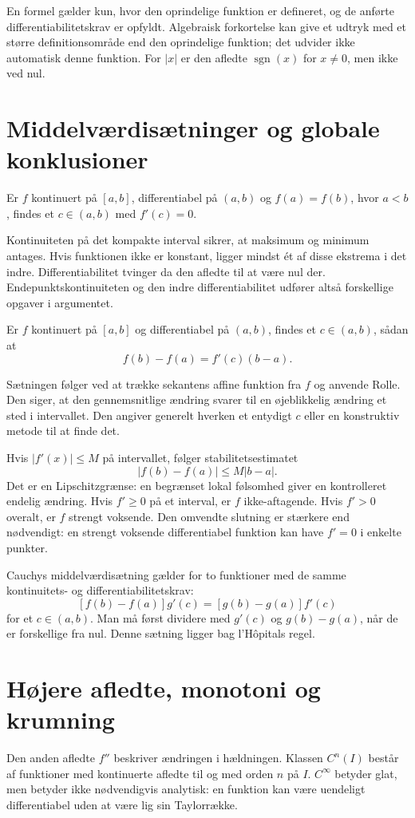 En formel gælder kun, hvor den oprindelige funktion er defineret, og de anførte differentiabilitetskrav er opfyldt. Algebraisk forkortelse kan give et udtryk med et større definitionsområde end den oprindelige funktion; det udvider ikke automatisk denne funktion. For $|x|$ er den afledte $\operatorname{sgn}(x)$ for $x\ne0$, men ikke ved nul.

\section{Middelværdisætninger og globale konklusioner}
\label{sec:middel}
\begin{saetning}[Rolle]
Er $f$ kontinuert på $[a,b]$, differentiabel på $(a,b)$ og $f(a)=f(b)$, hvor $a<b$, findes et $c\in(a,b)$ med $f'(c)=0$.
\end{saetning}
Kontinuiteten på det kompakte interval sikrer, at maksimum og minimum antages. Hvis funktionen ikke er konstant, ligger mindst ét af disse ekstrema i det indre. Differentiabilitet tvinger da den afledte til at være nul der. Endepunktskontinuiteten og den indre differentiabilitet udfører altså forskellige opgaver i argumentet.

\begin{saetning}
Er $f$ kontinuert på $[a,b]$ og differentiabel på $(a,b)$, findes et $c\in(a,b)$, sådan at
\[
 f(b)-f(a)=f'(c)(b-a).
\]
\end{saetning}
Sætningen følger ved at trække sekantens affine funktion fra $f$ og anvende Rolle. Den siger, at den gennemsnitlige ændring svarer til en øjeblikkelig ændring et sted i intervallet. Den angiver generelt hverken et entydigt $c$ eller en konstruktiv metode til at finde det.

Hvis $|f'(x)|\le M$ på intervallet, følger stabilitetsestimatet
\[
 |f(b)-f(a)|\le M|b-a|.
\]
Det er en Lipschitzgrænse: en begrænset lokal følsomhed giver en kontrolleret endelig ændring. Hvis $f'\ge0$ på et interval, er $f$ ikke-aftagende. Hvis $f'>0$ overalt, er $f$ strengt voksende. Den omvendte slutning er stærkere end nødvendigt: en strengt voksende differentiabel funktion kan have $f'=0$ i enkelte punkter.

Cauchys middelværdisætning gælder for to funktioner med de samme kontinuitets- og differentiabilitetskrav:
\[
 [f(b)-f(a)]g'(c)=[g(b)-g(a)]f'(c)
\]
for et $c\in(a,b)$. Man må først dividere med $g'(c)$ og $g(b)-g(a)$, når de er forskellige fra nul. Denne sætning ligger bag l'Hôpitals regel.

\section{Højere afledte, monotoni og krumning}
\label{sec:hoejere}
Den anden afledte $f''$ beskriver ændringen i hældningen. Klassen $C^n(I)$ består af funktioner med kontinuerte afledte til og med orden $n$ på $I$. $C^\infty$ betyder glat, men betyder ikke nødvendigvis analytisk: en funktion kan være uendeligt differentiabel uden at være lig sin Taylorrække.

